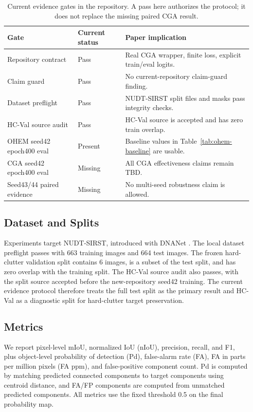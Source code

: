 \documentclass[letterpaper]{article}
\begin{document}
\begin{table}[t]
\centering
\caption{Current evidence gates in the repository. A pass here authorizes the protocol; it does not replace the missing paired CGA result.}
\label{tab:evidence-gates}
\small
\begin{tabular}{lll}
\toprule
Gate & Current status & Paper implication \\
\midrule
Repository contract & Pass & Real CGA wrapper, finite loss, explicit train/eval logits. \\
Claim guard & Pass & No current-repository claim-guard finding. \\
Dataset preflight & Pass & NUDT-SIRST split files and masks pass integrity checks. \\
HC-Val source audit & Pass & HC-Val source is accepted and has zero train overlap. \\
OHEM seed42 epoch400 eval & Present & Baseline values in Table~\ref{tab:ohem-baseline} are usable. \\
CGA seed42 epoch400 eval & Missing & All CGA effectiveness claims remain TBD. \\
Seed43/44 paired evidence & Missing & No multi-seed robustness claim is allowed. \\
\bottomrule
\end{tabular}
\end{table}

\subsection{Dataset and Splits}

Experiments target NUDT-SIRST, introduced with DNANet \citep{li2023dnanet}. The local dataset preflight passes with 663 training images and 664 test images. The frozen hard-clutter validation split contains 6 images, is a subset of the test split, and has zero overlap with the training split. The HC-Val source audit also passes, with the split source accepted before the new-repository seed42 training. The current evidence protocol therefore treats the full test split as the primary result and HC-Val as a diagnostic split for hard-clutter target preservation.

\subsection{Metrics}

We report pixel-level mIoU, normalized IoU (nIoU), precision, recall, and F1, plus object-level probability of detection (Pd), false-alarm rate (FA), FA in parts per million pixels (FA ppm), and false-positive component count. Pd is computed by matching predicted connected components to target components using centroid distance, and FA/FP components are computed from unmatched predicted components. All metrics use the fixed threshold 0.5 on the final probability map.
\end{document}
